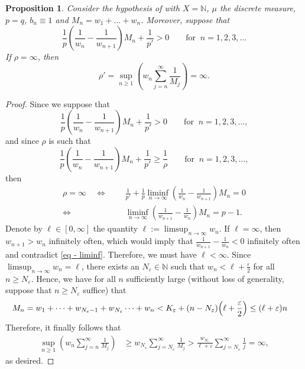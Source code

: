 \documentclass[oneside,10pt]{article}          %
\newtheorem{prop}{Proposition}
\numberwithin{equation}{section}
\begin{document}
\begin{prop}\label{prop - infty}
    Consider the hypothesis of  with $X=\mathbb{N}$, $\mu$ the discrete measure, $p=q$, $b_n\equiv 1$ and $M_n=w_1+\dots+w_n$. Moreover, suppose that 
    \begin{equation}
        \frac{1}{p}\left(\frac{1}{w_n}-\frac{1}{w_{n+1}}\right)\!M_n+\frac{1}{p'} > 0 \qquad \text{for }~ n=1,2,3,\dots %
    \end{equation}
    If $\rho=\infty$, then 
    \[
    \rho' = \sup_{n\geq 1} \left( w_n \sum_{j=n}^{\infty} \frac{1}{M_j} \right) = \infty.
    \]
\end{prop}
\begin{proof}
    Since we suppose that 
    \[
    \frac{1}{p}\left(\frac{1}{w_n}-\frac{1}{w_{n+1}}\right)\!M_n+\frac{1}{p'} > 0 \qquad \text{for }~ n=1,2,3,\dots,
    \]
    and since $\rho$ is such that 
    \[
    \frac{1}{p}\left(\frac{1}{w_n}-\frac{1}{w_{n+1}}\right)\!M_n+\frac{1}{p'} \geq \frac{1}{\rho} \qquad \text{for }~ n=1,2,3,\dots,
    \]
    then 
    \begin{align}\label{eq - liminf}
        \rho=\infty \quad\iff\quad  \,\,&\frac{1}{p'} + \frac{1}{p} \liminf_{n\to\infty} \left(\frac{1}{w_n}-\frac{1}{w_{n+1}}\right)\!M_n =0 \nonumber\\
        \iff\quad  \,\,&\liminf_{n\to\infty} \left(\frac{1}{w_{n+1}}-\frac{1}{w_n}\right)\!M_n = p-1.
    \end{align} 
    Denote by $\ell\in [0,\infty]$ the quantity $\ell:= \limsup_{n\to\infty}w_{n}$. If $\ell=\infty$, then $w_{n+1} > w_n$ infinitely often, which would imply that $\frac{1}{w_{n+1}}-\frac{1}{w_n} < 0$ infinitely often and contradict \eqref{eq - liminf}. Therefore, we must have $\ell<\infty$. 
    Since $\limsup_{n\to\infty} w_n = \ell$, there exists an $N_\varepsilon\in \mathbb{N}$ such that $w_n < \ell+\frac{\varepsilon}{2}$ for all $n\geq N_\varepsilon$. Hence, we have for all $n$ sufficiently large (without loss of generality, suppose that $n\geq N_\varepsilon$ suffice) that 
    \begin{align*}
        M_n &= w_1+\cdots +w_{N_\varepsilon-1} + w_{N_\varepsilon}  \cdots + w_n <  K_\varepsilon + (n-N_\varepsilon) \Bigl(\ell+\frac{\varepsilon}{2}\Bigr) \leq (\ell+\varepsilon) n
    \end{align*}
    Therefore, it finally follows that
    \begin{align*}
        \sup_{n\geq 1} \left( w_n \sum_{j=n}^{\infty} \frac{1}{M_j} \right) &\geq w_{N_\varepsilon} \sum_{j=N_\varepsilon}^{\infty} \frac{1}{M_j} > \frac{w_{N_\varepsilon}}{\ell+\varepsilon}  \sum_{j=N_\varepsilon}^{\infty} \frac{1}{j} = \infty,
    \end{align*} 
    as desired.
\end{proof}
\end{document}
